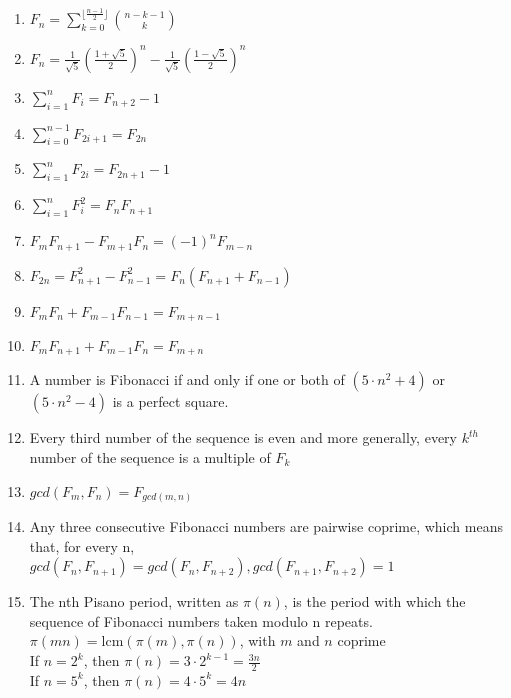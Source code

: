\begin{enumerate}
  \item $F_n = \sum_{k=0}^{\lfloor\frac{n-1}{2}\rfloor} \binom{n - k - 1}{k}$
  \item $F_n = \frac{1}{\sqrt{5}} \left( \frac{1 + \sqrt{5}}{2} \right)^n - \frac{1}{\sqrt{5}} \left( \frac{1 - \sqrt{5}}{2} \right)^n$
  \item $\sum_{i=1}^{n} F_i = F_{n+2} - 1$
  \item $\sum_{i=0}^{n-1} F_{2i+1} = F_{2n}$
  \item $\sum_{i=1}^{n} F_{2i} = F_{2n+1} - 1$
  \item $\sum_{i=1}^{n} F_{i}^2 = F_n F_{n+1}$
  \item $F_m F_{n+1} - F_{m+1} F_n = (-1)^n F_{m-n}$
  \item $F_{2n} = F_{n+1}^2 - F_{n-1}^2 = F_n(F_{n+1} + F_{n-1})$
  \item $F_m F_n + F_{m-1} F_{n-1} = F_{m+n-1}$
  \item $F_m F_{n+1} + F_{m-1} F_n = F_{m+n}$
  \item A number is Fibonacci if and only if one or both of $(5 \cdot n^2 + 4)$ or $(5 \cdot n^2 - 4)$ is a perfect square.
  \item Every third number of the sequence is even and more generally, every $k^{th}$ number of the sequence is a multiple of $F_k$
  \item $gcd(F_m, F_n) = F_{gcd(m,n)}$
  \item Any three consecutive Fibonacci numbers are pairwise coprime, which means that, for every n,\\
  $gcd(F_n, F_{n+1}) = gcd(F_n, F_{n+2}), gcd(F_{n+1}, F_{n+2}) = 1$
  \item The nth Pisano period, written as $\pi(n)$, is the period with which the sequence of Fibonacci numbers taken modulo n repeats.\\
  $\pi(mn) = \text{lcm}(\pi(m), \pi(n))$, with $m$ and $n$ coprime\\
  If $n = 2^k$, then $\pi(n) = 3 \cdot 2^{k-1} = \frac{3n}{2}$\\
  If $n = 5^k$, then $\pi(n) = 4 \cdot 5^k = 4n$
\end{enumerate}
